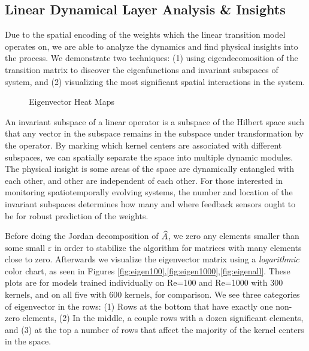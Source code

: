 \subsection{Linear Dynamical Layer Analysis \& Insights}\label{sec:analysis}
Due to the spatial encoding of the weights which the linear transition model operates on, we are able to analyze the dynamics and find physical insights into the process. We demonstrate two techniques: (1) using eigendecomosition of the transition matrix to discover the eigenfunctions and invariant subspaces of system, and (2) visualizing the most significant spatial interactions in the system.

\begin{figure*}[h] %
	\centering
	\caption{Eigenvector Heat Maps}
\end{figure*}

An invariant subspace of a linear operator is a subspace of the Hilbert space such that any vector in the subspace remains in the subspace under transformation by the operator. By marking which kernel centers are associated with different subspaces, we can spatially separate the space into multiple dynamic modules. The physical insight is some areas of the space are dynamically entangled with each other, and other are independent of each other. For those interested in monitoring spatiotemporally evolving systems, the number and location of the invariant subspaces determines how many and where feedback sensors ought to be for robust prediction of the weights.

Before doing the Jordan decomposition of $\widehat{A}$, we zero any elements smaller than some small $\varepsilon$ in order to stabilize the algorithm for matrices with many elements close to zero. Afterwards we visualize the eigenvector matrix using a \emph{logarithmic} color chart, as seen in Figures \ref{fig:eigen100},\ref{fig:eigen1000},\ref{fig:eigenall}. These plots are for models trained individually on Re=100 and Re=1000 with 300 kernels, and on all five with 600 kernels, for comparison. We see three categories of eigenvector in the rows: (1) Rows at the bottom that have exactly one non-zero elements, (2) In the middle, a couple rows with a dozen significant elements, and (3) at the top a number of rows that affect the majority of the kernel centers in the space.

